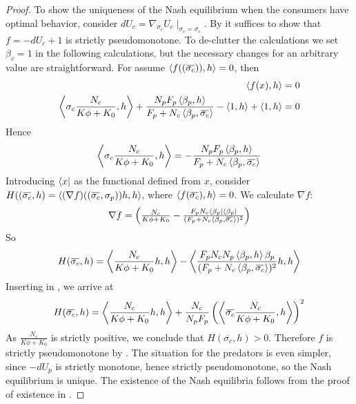 \begin{proof}
  To show the uniqueness of the Nash equilibrium when the consumers have optimal behavior, consider $dU_c = \nabla_{\sigma_c} U_c \mid_{\sigma_c = \overbar{\sigma_c}}$.  By  it suffices to show that $f = -dU_c + 1$ is strictly pseudomonotone. To de-clutter the calculations we set $\beta_c = 1$ in the following calculations, but the necessary changes for an arbitrary value are straightforward.
  For  assume $\ip{f((\overbar{\sigma_c}))}{h} = 0$, then
  \begin{equation}
    \begin{split}
      \ip{f(x)}{h} = 0 \\
      \ip{\sigma_c \frac{N_c}{K\phi + K_0} }{h} + \frac{N_p F_p \ip{\beta_p}{h}}{F_p + N_c\ip{\beta_p}{\overbar{\sigma_c}}} - \ip{1}{h} + \ip{1}{h} = 0
    \end{split}
  \end{equation}
  Hence
  \begin{equation}
    \label{eq:useful_eq}
    \ip{\sigma_c \frac{N_c}{K\phi + K_0} }{h} = - \frac{N_p F_p \ip{\beta_p}{h}}{F_p + N_c\ip{\beta_p}{\overbar{\sigma_c}}}
  \end{equation}
  Introducing $\langle x \rvert$ as the functional defined from $x$, consider $H((\overbar{\sigma_c},h)= \ip{(\nabla f)((\overbar{\sigma_c},\sigma_p))h}{h}$, where $\ip{f(\overbar{\sigma_c})}{h} = 0$. We calculate $\nabla f$:
    \begin{equation}
      \nabla f = \begin{pmatrix} \frac{N_c}{K \phi + K_0} - \frac{F_p N_c \bra{\beta_p} \bra{\beta_p}}{(F_p + N_c\ip{\beta_p}{\overbar{\sigma_c}})^2}
    \end{pmatrix}
    \end{equation}
  So
  \begin{equation}
    \label{eq:H_eq}
    H(\overbar{\sigma_c},h) = \ip{\frac{N_c}{K \phi + K_0}h}{h} - \ip{\frac{F_p N_c N_p\ip{\beta_p}{h}\beta_p}{(F_p + N_c\ip{\beta_p}{\overbar{\sigma_c}})^2}h}{h}
  \end{equation}
  Inserting  in , we arrive at
  \begin{equation}
    H(\overbar{\sigma_c},h) = \ip{\frac{N_c}{K \phi + K_0}h}{h} + \frac{N_c}{N_p F_p}\pa{\ip{\overbar{\sigma_c} \frac{N_c}{K\phi + K_0}}{h}}^2
  \end{equation}
  As $\frac{N_c}{K \phi + K_0}$ is strictly positive, we conclude that $H(\overbar{\sigma_c},h)>0$. Therefore $f$ is strictly pseudomonotone by . The situation for the predators is even simpler, since $-dU_p$ is strictly monotone, hence strictly pseudomonotone, so the Nash equilibrium is unique.
    The existence of the Nash equilibria follows from the proof of existence in .
\end{proof}
